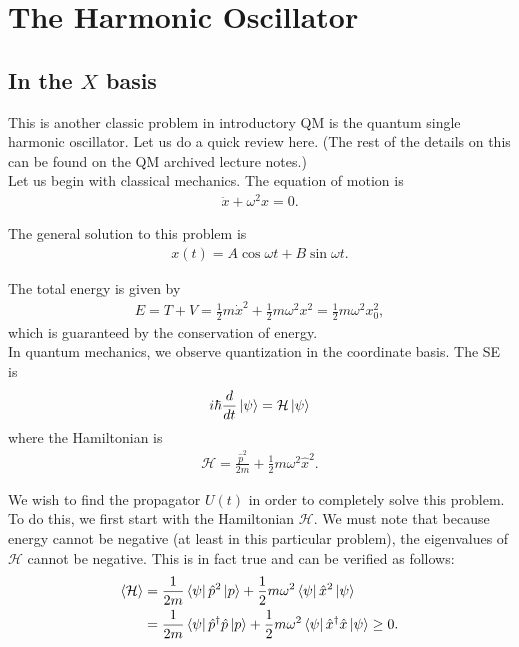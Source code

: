 \documentclass{book}
\theoremstyle{definition}
\newcommand{\ham}{\mathcal{H}}
\newcommand{\f}[2]{\frac{#1}{#2}}
\begin{document}
\newpage


\section{The Harmonic Oscillator}

\subsection{In the $X$ basis}


This is another classic problem in introductory QM is the quantum single harmonic oscillator. Let us do a quick review here. (The rest of the details on this can be found on the QM archived lecture notes.)\\

Let us begin with classical mechanics. The equation of motion is 
\begin{align}
\ddot{x} + \omega^2 x = 0.
\end{align}

The general solution to this problem is
\begin{align}
x(t) = A\cos\omega t + B\sin\omega t.
\end{align}

The total energy is given by
\begin{align}
E = T+V = \f{1}{2}m\dot{x}^2 + \f{1}{2}m\omega^2 x^2 = \f{1}{2}m\omega^2x_0^2,
\end{align}
which is guaranteed by the conservation of energy. \\

In quantum mechanics, we observe quantization in the coordinate basis. The SE is
\begin{align}
i\hbar \f{d}{dt}\ket{\psi} = \ham\ket{\psi}
\end{align}
where the Hamiltonian is
\begin{align}
\ham = \f{\hat{p}^2}{2m} + \f{1}{2}m\omega^2 \hat{x}^2.
\end{align}

We wish to find the propagator $U(t)$ in order to completely solve this problem. To do this, we first start with the Hamiltonian $\ham$. We must note that because energy cannot be negative (at least in this particular problem), the eigenvalues of $\ham$ cannot be negative. This is in fact true and can be verified as follows:
\begin{align}
\langle \ham \rangle &= \f{1}{2m}\bra{\psi}\hat{p}^2\ket{p} + \f{1}{2}m\omega^2\bra{\psi}\hat{x}^2\ket{\psi}\\
&= \f{1}{2m}\bra{\psi}\hat{p}^\dagger \hat{p}\ket{p} + \f{1}{2}m\omega^2\bra{\psi}\hat{x}^\dagger\hat{x}\ket{\psi} \geq 0.
\end{align}
\end{document}
